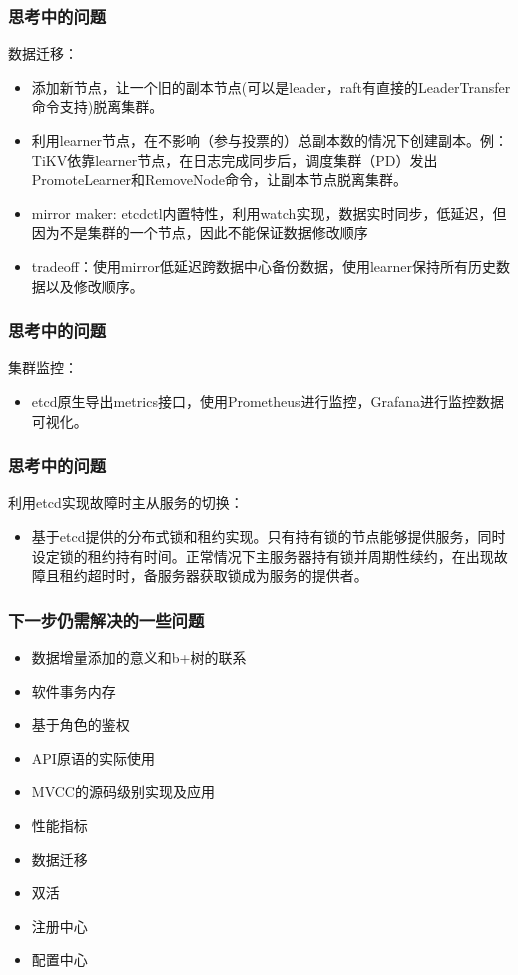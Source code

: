 \documentclass{beamer}
\begin{document}
%
%



%
%

\begin{frame}
\frametitle{思考中的问题}
    数据迁移：
    \begin{itemize}
        \item 添加新节点，让一个旧的副本节点(可以是leader，raft有直接的LeaderTransfer命令支持)脱离集群。
        \item 利用learner节点，在不影响（参与投票的）总副本数的情况下创建副本。例：TiKV依靠learner节点，在日志完成同步后，调度集群（PD）发出PromoteLearner和RemoveNode命令，让副本节点脱离集群。
        \item mirror maker: etcdctl内置特性，利用watch实现，数据实时同步，低延迟，但因为不是集群的一个节点，因此不能保证数据修改顺序
        \item \alert{tradeoff}：使用mirror低延迟跨数据中心备份数据，使用learner保持所有历史数据以及修改顺序。
    \end{itemize}
\end{frame}

\begin{frame}
\frametitle{思考中的问题}
    集群监控：
    \begin{itemize}
        \item etcd原生导出metrics接口，使用Prometheus进行监控，Grafana进行监控数据可视化。
    \end{itemize}
\end{frame}

\begin{frame}
\frametitle{思考中的问题}
    利用etcd实现故障时主从服务的切换：
    \begin{itemize}
        \item 基于etcd提供的分布式锁和租约实现。只有持有锁的节点能够提供服务，同时设定锁的租约持有时间。正常情况下主服务器持有锁并周期性续约，在出现故障且租约超时时，备服务器获取锁成为服务的提供者。
    \end{itemize}
\end{frame}

%
%

\begin{frame}
\frametitle{下一步仍需解决的一些问题}

\begin{itemize}
    \item 数据增量添加的意义和b+树的联系
    \item 软件事务内存
    \item 基于角色的鉴权
    \item API原语的实际使用
    \item MVCC的源码级别实现及应用
    \item 性能指标
    \item 数据迁移
    \item 双活
    \item 注册中心
    \item 配置中心
\end{itemize}
\end{frame}
\end{document}
